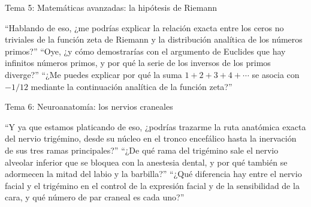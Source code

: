 \begin{frame}{Tema 5: Matemáticas avanzadas: la hipótesis de Riemann}
  \footnotesize
  \begin{enumerate}
    \setlength{\itemsep}{0.12cm}
      {\enquote{Hablando de eso, ¿me podrías explicar la relación exacta entre los ceros no triviales de la función zeta de Riemann y la distribución analítica de los números primos?}}
      {\enquote{Oye, ¿y cómo demostrarías con el argumento de Euclides que hay infinitos números primos, y por qué la serie de los inversos de los primos diverge?}}
      {\enquote{¿Me puedes explicar por qué la suma $1 + 2 + 3 + 4 + \cdots$ se asocia con $-1/12$ mediante la continuación analítica de la función zeta?}}
  \end{enumerate}
\end{frame}

\begin{frame}{Tema 6: Neuroanatomía: los nervios craneales}
  \footnotesize
  \begin{enumerate}
    \setlength{\itemsep}{0.12cm}
      {\enquote{Y ya que estamos platicando de eso, ¿podrías trazarme la ruta anatómica exacta del nervio trigémino, desde su núcleo en el tronco encefálico hasta la inervación de sus tres ramas principales?}}
      {\enquote{¿De qué rama del trigémino sale el nervio alveolar inferior que se bloquea con la anestesia dental, y por qué también se adormecen la mitad del labio y la barbilla?}}
      {\enquote{¿Qué diferencia hay entre el nervio facial y el trigémino en el control de la expresión facial y de la sensibilidad de la cara, y qué número de par craneal es cada uno?}}
  \end{enumerate}
\end{frame}

